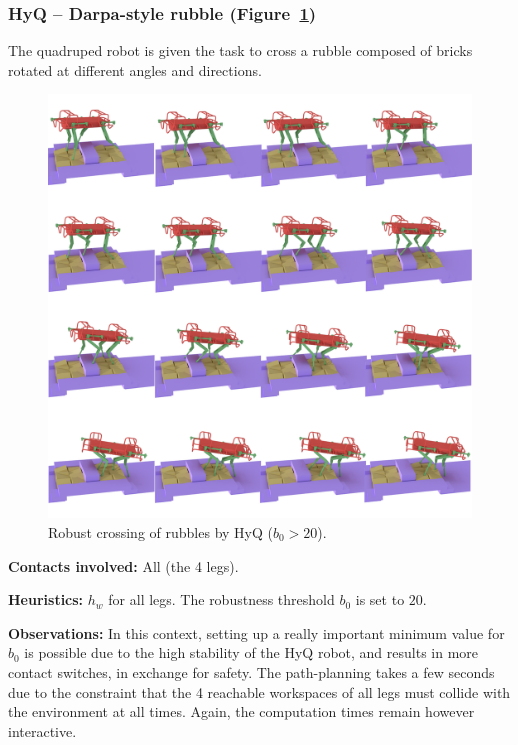 \subsubsection{HyQ -- Darpa-style rubble (Figure~\ref{fig:darpa})}
The quadruped robot is given the task to cross a rubble composed of bricks rotated at different angles and directions.

\begin{figure}
  \centering
  \includegraphics[width=1\linewidth]{figures/darpa}
  \caption{
           Robust crossing of rubbles by HyQ ($b_0 > 20$). }
		   \label{fig:darpa}
\end{figure}


\noindent\textbf{Contacts involved:} All (the 4 legs).

\noindent\textbf{Heuristics:} $h_w$ for all legs. The robustness threshold $b_0$ is set to $20$.

\noindent\textbf{Observations:} In this context, setting up a really important minimum value for $b_0$ is possible due to the high
stability of the HyQ robot, and results in more contact switches, in exchange for safety. The path-planning takes a few seconds due to the constraint that the 4 reachable workspaces of all legs must
collide with the environment at all times. %
Again, the computation times remain however \gls{interactive}.

